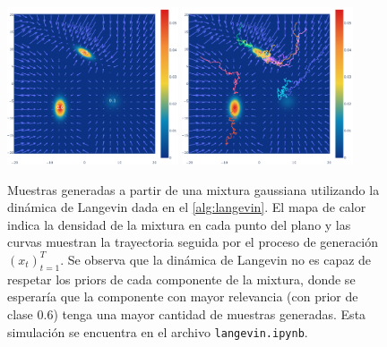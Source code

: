 \begin{figure}
    \centering
    \includegraphics[width=0.45\textwidth]{images/dm/langevin_gmm}
    \includegraphics[width=0.45\textwidth]{images/dm/langevin_gmm_samples}
    \caption{Muestras generadas a partir de una mixtura gaussiana utilizando la dinámica de Langevin dada en el \autoref{alg:langevin}. El mapa de calor indica la densidad de la mixtura en cada punto del plano y las curvas muestran la trayectoria seguida por el proceso de generación $(x_t)_{t=1}^T$. Se observa que la dinámica de Langevin no es capaz de respetar los priors de cada componente de la mixtura, donde se esperaría que la componente con mayor relevancia (con prior de clase $0.6$) tenga una mayor cantidad de muestras generadas. Esta simulación se encuentra en el archivo \texttt{langevin.ipynb}.}
    \label{fig:dm/langevin}
\end{figure}


